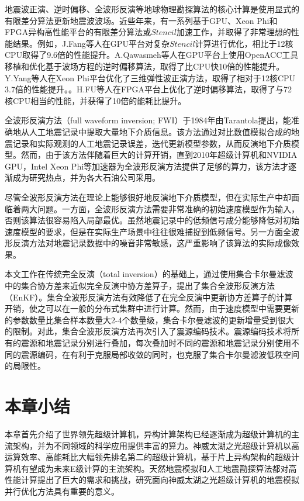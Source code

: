 地震波正演、逆时偏移、全波形反演等地球物理勘探算法的核心计算是使用显式的有限差分算法更新地震波波场。近些年来，有一系列基于GPU、Xeon Phi和FPGA异构高性能平台的有限差分算法或$Stencil$加速工作，并取得了非常理想的性能结果\cite{qawasmeh2015gpu,martinez2015towards,fang2015optimizing,liu20153d,clapp2015seismic,costa2015half,fu2012revisiting,clapp2010selecting}。例如，J.Fang等人在GPU平台对复杂$Stencil$计算进行优化，相比于12核CPU取得了9.6倍的性能提升\cite{fang2015optimizing}。A.Qawasmeh等人在GPU平台上使用OpenACC工具移植和优化基于波场方程的逆时偏移算法，取得了比CPU快10倍的性能提升\cite{qawasmeh2015gpu}。Y.Yang等人在Xeon Phi平台优化了三维弹性波正演方法，取得了相对于12核CPU 3.7倍的性能提升。\cite{you2013accelerating}。H.FU等人在FPGA平台上优化了逆时偏移算法，取得了与72核CPU相当的性能，并获得了10倍的能耗比提升。

全波形反演方法（full waveform inversion; FWI）于1984年由Tarantola提出，能准确地从人工地震记录中提取大量地下介质信息\cite{tarantola1984inversion,plessix2012full,brossier2009seismic}。该方法通过对比数值模拟合成的地震记录和实际观测的人工地震记录误差，迭代更新模型参数，从而反演地下介质模型\cite{yushu}。然而，由于该方法伴随着巨大的计算开销，直到2010年超级计算机和NVIDIA GPU，Intel Xeon Phi等加速器为全波形反演方法提供了足够的算力，该方法才逐渐成为研究热点，并为各大石油公司采用。

尽管全波形反演方法在理论上能够很好地反演地下介质模型，但在实际生产中却面临着两大问题。一方面，全波形反演方法需要非常准确的初始速度模型作为输入，否则该算法很容易陷入局部最优\cite{virieux2009overview}。虽然地震记录中的低频信号成分能够降低对初始速度模型的要求，但是在实际生产场景中往往很难捕捉到低频信号\cite{sirgue2006importance}。另一方面全波形反演方法对地震记录数据中的噪音非常敏感，这严重影响了该算法的实际成像效果。

本文工作在传统完全反演\cite{tarantola1982generalized}（total inversion）的基础上，通过使用集合卡尔曼滤波\cite{evensen2003ensemble}中的集合协方差来近似完全反演中协方差算子，提出了集合全波形反演方法（EnKF）\cite{yushu,he2015ensemble}。集合全波形反演方法有效降低了在完全反演中更新协方差算子的计算开销，使之可以在一般的分布式集群中进行计算。然而，由于速度模型中需要更新的参数数量比集合样本数量大2-4个数量级，集合卡尔曼滤波的更新增量受到很大的限制。对此，集合全波形反演方法再次引入了震源编码技术\cite{krebs2009fast}。震源编码技术将所有的震源和地震记录分别进行叠加，每次叠加时不同的震源和地震记录分别使用不同的震源编码，在有利于克服局部收敛的同时\cite{castellanos2014fast}，也克服了集合卡尔曼滤波低秩空间的局限性。

\section{本章小结}

本章首先介绍了世界领先超级计算机，异构计算架构已经逐渐成为超级计算机的主流架构，并为不同领域的科学应用提供丰富的算力。神威太湖之光超级计算机以高运算效率、高能耗比大幅领先排名第二的超级计算机，基于片上异构架构的超级计算机有望成为未来E级计算的主流架构。天然地震模拟和人工地震勘探算法都对高性能计算提出了巨大的需求和挑战，研究面向神威太湖之光超级计算机的地震模拟并行优化方法具有重要的意义。
